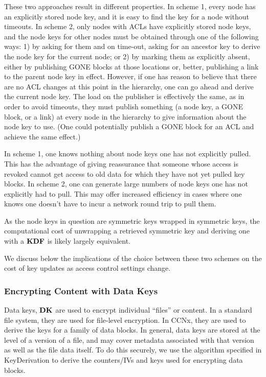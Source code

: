 These two approaches result in different properties. In scheme 1,
every node has an explicitly stored node key, and it is easy to find
the key for a node without timeouts. In scheme 2, only nodes with ACLs
have explicitly stored node keys, and the node keys for other nodes
must be obtained through one of the following ways: 1) by asking for
them and on time-out, asking for an ancestor key to derive the node
key for the current node; or 2) by marking them as explicitly absent,
either by publishing GONE blocks at those locations or, better,
publishing a link to the parent node key in effect. However, if one
has reason to believe that there are no ACL changes at this point in
the hierarchy, one can go ahead and derive the current node key. The
load on the publisher is effectively the same, as in order to avoid
timeouts, they must publish something (a node key, a GONE block, or a
link) at every node in the hierarchy to give information about the
node key to use. (One could potentially publish a GONE block for an
ACL and achieve the same effect.)

In scheme 1, one knows nothing about node keys one has not explicitly
pulled. This has the advantage of giving reassurance that someone
whose access is revoked cannot get access to old data for which they
have not yet pulled key blocks. In scheme 2, one can generate large
numbers of node keys one has not explicitly had to pull. This may
offer increased efficiency in cases where one knows one doesn't have
to incur a network round trip to pull them.

As the node keys in question are symmetric keys wrapped in symmetric
keys, the computational cost of unwrapping a retrieved symmetric key
and deriving one with a ${\textbf{KDF}}$ is likely largely equivalent.

We discuss below the implications of the choice between these two
schemes on the cost of key updates as access control settings change.

\subsubsection{Encrypting Content with Data Keys}

Data keys, ${\textbf{DK}}$ are used to encrypt individual ``files'' or
content. In a standard file system, they are used for file-level
encryption. In CCNx, they are used to derive the keys for a family of
data blocks. In general, data keys are stored at the level of a
version of a file, and may cover metadata associated with that version
as well as the file data itself. To do this securely, we use the
algorithm specified in KeyDerivation to derive the counters/IVs and
keys used for encrypting data blocks.

